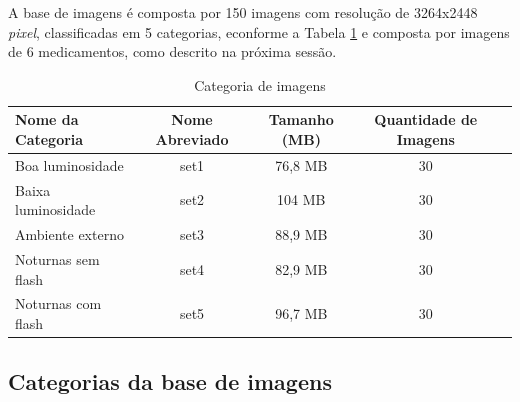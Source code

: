A base de imagens é composta por 150 imagens com resolução de 3264x2448 \textit{pixel}, classificadas em 5 categorias, econforme a Tabela \ref{tab:catImg} e composta por imagens de 6 medicamentos, como descrito na próxima sessão.


\begin{table}[]
\caption{Categoria de imagens}
\label{tab:catImg}
\centering
\begin{tabular}{lcccc}
\hline
Nome da Categoria & Nome Abreviado & Tamanho (MB) & Quantidade de Imagens \\ \hline
Boa luminosidade & set1 & 76,8 MB & 30 \\
Baixa luminosidade & set2 & 104 MB & 30 \\
Ambiente externo & set3 & 88,9 MB & 30 \\
Noturnas sem flash & set4 & 82,9 MB & 30 \\
Noturnas com flash & set5 & 96,7 MB & 30 \\ \hline
\end{tabular}
\end{table}



 
\subsection{Categorias da base de imagens}


